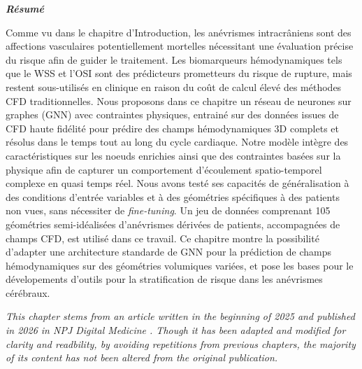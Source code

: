 \begin{chapterabstract}
\textbf{\textit{Résumé}}
\vspace{2pt}

Comme vu dans le chapitre d'Introduction, les anévrismes intracrâniens sont des affections vasculaires potentiellement mortelles nécessitant une évaluation précise du risque afin de guider le traitement. Les biomarqueurs hémodynamiques tels que le WSS et l'OSI sont des prédicteurs prometteurs du risque de rupture, mais restent sous-utilisés en clinique en raison du coût de calcul élevé des méthodes CFD traditionnelles. Nous proposons dans ce chapitre un réseau de neurones sur graphes (GNN) avec contraintes physiques, entrainé sur des données issues de CFD haute fidélité pour prédire des champs hémodynamiques 3D complets et résolus dans le temps tout au long du cycle cardiaque. Notre modèle intègre des caractéristiques sur les noeuds enrichies ainsi que des contraintes basées sur la physique afin de capturer un comportement d'écoulement spatio-temporel complexe en quasi temps réel. Nous avons testé ses capacités de généralisation à des conditions d'entrée variables et à des géométries spécifiques à des patients non vues, sans nécessiter de \textit{fine-tuning}. Un jeu de données comprenant 105 géométries semi-idéalisées d'anévrismes dérivées de patients, accompagnées de champs CFD, est utilisé dans ce travail. Ce chapitre montre la possibilité d'adapter une architecture standarde de GNN pour la prédiction de champs hémodynamiques sur des géométries volumiques variées, et pose les bases pour le dévelopements d'outils pour la stratification de risque dans les anévrismes cérébraux. 
\end{chapterabstract}

\vspace{2pt}

\textit{This chapter stems from an article written in the beginning of 2025 and published in 2026 in NPJ Digital Medicine \cite{lannelongue_physics_2026}. Though it has been adapted and modified for clarity and readbility, by avoiding repetitions from previous chapters, the majority of its content has not been altered from the original publication.}

